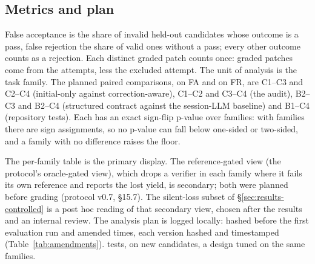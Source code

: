 \subsection{Metrics and plan}
\label{sec:design-metrics}
False acceptance is the share of invalid held-out candidates whose outcome is a pass, false rejection the share of valid ones without a pass; every other outcome counts as a rejection. Each distinct graded patch counts once:  graded patches come from the  attempts, less the excluded attempt. The unit of analysis is the task family. The  planned paired comparisons, on FA and on FR, are C1--C3 and C2--C4 (initial-only against correction-aware), C1--C2 and C3--C4 (the audit), B2--C3 and B2--C4 (structured contract against the session-LLM baseline) and B1--C4 (repository tests). Each has an exact sign-flip p-value over families: with  families there are  sign assignments, so no p-value can fall below  one-sided or  two-sided, and a family with no difference raises the floor.

The per-family table is the primary display. The reference-gated view (the protocol's oracle-gated view), which drops a verifier in each family where it fails its own reference and reports the lost yield, is secondary; both were planned before grading (protocol v0.7, \S15.7). The silent-loss subset of \S\ref{sec:results-controlled} is a post hoc reading of that secondary view, chosen after the results and an internal review. The analysis plan is logged locally: hashed before the first evaluation run and amended  times, each version hashed and timestamped (Table~\ref{tab:amendments}). \texttt{\FRESHRUN} tests, on new candidates, a design tuned on the same  families.
